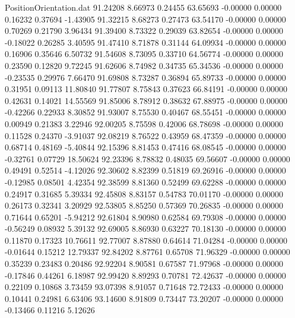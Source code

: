 \begin{filecontents}{PositionOrientation.dat}
  91.24208    8.66973    0.24455    63.65693   -0.00000    0.00000    0.16232    0.37694   -1.43905
  91.32215    8.68273    0.27473    63.54170   -0.00000    0.00000    0.70269    0.21790    3.96434
  91.39400    8.73322    0.29039    63.82654   -0.00000    0.00000   -0.18022    0.26285    3.40595
  91.47410    8.71878    0.31144    64.09934   -0.00000    0.00000    0.16906    0.35646    6.50732
  91.54608    8.73095    0.33710    64.56774   -0.00000    0.00000    0.23590    0.12820    9.72245
  91.62606    8.74982    0.34735    65.34536   -0.00000    0.00000   -0.23535    0.29976    7.66470
  91.69808    8.73287    0.36894    65.89733   -0.00000    0.00000    0.31951    0.09113   11.80840
  91.77807    8.75843    0.37623    66.84191   -0.00000    0.00000    0.42631    0.14021   14.55569
  91.85006    8.78912    0.38632    67.88975   -0.00000    0.00000   -0.42266    0.22933    8.30852
  91.93007    8.75530    0.40467    68.55451   -0.00000    0.00000    0.00949    0.21383    3.22946
  92.00205    8.75598    0.42006    68.78698   -0.00000    0.00000    0.11528    0.24370   -3.91037
  92.08219    8.76522    0.43959    68.47359   -0.00000    0.00000    0.68714    0.48169   -5.40844
  92.15396    8.81453    0.47416    68.08545   -0.00000    0.00000   -0.32761    0.07729   18.50624
  92.23396    8.78832    0.48035    69.56607   -0.00000    0.00000    0.49491    0.52514   -4.12026
  92.30602    8.82399    0.51819    69.26916   -0.00000    0.00000   -0.12985    0.08501    4.42354
  92.38599    8.81360    0.52499    69.62288   -0.00000    0.00000    0.24917    0.31685    5.39334
  92.45808    8.83157    0.54783    70.01170   -0.00000    0.00000    0.26173    0.32341    3.20929
  92.53805    8.85250    0.57369    70.26835   -0.00000    0.00000    0.71644    0.65201   -5.94212
  92.61804    8.90980    0.62584    69.79308   -0.00000    0.00000   -0.56249    0.08932    5.39132
  92.69005    8.86930    0.63227    70.18130   -0.00000    0.00000    0.11870    0.17323   10.76611
  92.77007    8.87880    0.64614    71.04284   -0.00000    0.00000   -0.01644    0.15212   12.79337
  92.84202    8.87761    0.65708    71.96329   -0.00000    0.00000    0.35239    0.23483    0.20486
  92.92204    8.90581    0.67587    71.97968   -0.00000    0.00000   -0.17846    0.44261    6.18987
  92.99420    8.89293    0.70781    72.42637   -0.00000    0.00000    0.22109    0.10868    3.73459
  93.07398    8.91057    0.71648    72.72433   -0.00000    0.00000    0.10441    0.24981    6.63406
  93.14600    8.91809    0.73447    73.20207   -0.00000    0.00000   -0.13466    0.11216    5.12626

\end{filecontents}
